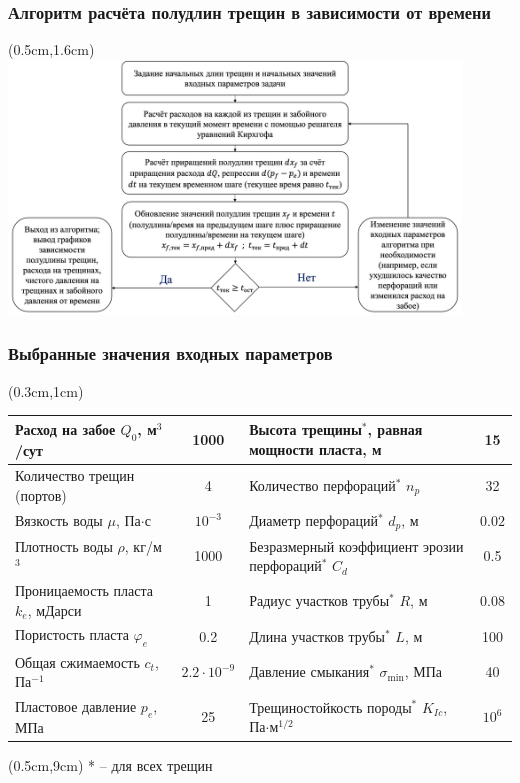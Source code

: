 \documentclass{beamer}
\begin{document}
\begin{frame}
\frametitle{Алгоритм расчёта полудлин трещин в зависимости от времени}

\begin{textblock*}{12cm}(0.5cm,1.6cm)
\includegraphics[width=12cm]{koning_scheme.jpg}
\end{textblock*}

\end{frame}


\begin{frame}
\frametitle{Выбранные значения входных параметров}

\begin{textblock*}{6cm}(0.3cm,1cm)
\renewcommand{\arraystretch}{1.2}

\small
\begin{center}
\begin{tabular}{|p{4cm}|c|p{4.3cm}|c|}
\hline
Расход на забое $Q_0$, м$^3$/сут & 1000 & Высота трещины$^{*}$, равная мощности пласта, м & 15 \\
\hline
Количество трещин (портов) & 4 & Количество перфораций$^{*}$ $n_p$ & 32 \\
\hline
Вязкость воды $\mu$, Па$\cdot$с & $10^{-3}$ & Диаметр перфораций$^{*}$ $d_p$, м & $0.02$ \\
\hline
Плотность воды $\rho$, кг/м$^3$ & 1000 & Безразмерный коэффициент эрозии перфораций$^{*}$ $C_d$ & 0.5 \\
\hline
Проницаемость пласта $k_e$, мДарси & 1 & Радиус участков трубы$^{*}$ $R$, м & 0.08 \\
\hline
Пористость пласта $\varphi_e$ & 0.2 & Длина участков трубы$^{*}$ $L$, м & 100 \\
\hline
Общая сжимаемость $c_t$, Па$^{-1}$ & $2.2\cdot10^{-9}$ & Давление смыкания$^{*}$ $\sigma_{\text{min}}$, МПа & 40 \\
\hline
Пластовое давление $p_e$, МПа & 25 & Трещиностойкость породы$^{*}$ $K_{Ic}$, Па$\cdot\text{м}^{1/2}$ & $10^6$ \\
\hline
\end{tabular}
\end{center}
\end{textblock*}

\begin{textblock*}{6cm}(0.5cm,9cm)
\scriptsize
\textcolor{lit_gray}{* -- для всех трещин}
\end{textblock*}

\normalsize

\end{frame}
\end{document}
